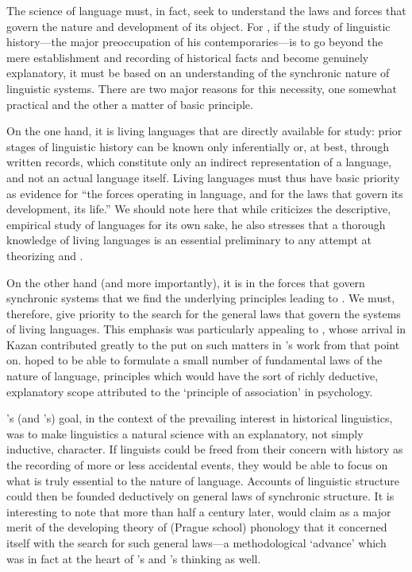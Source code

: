 The science of language must, in fact, seek to understand the laws and
forces that govern the nature and development of its object. For
{\Baudouin}, if the study of linguistic history—the major preoccupation
of his contemporaries—is to go beyond the mere establishment and
recording of historical facts and become genuinely explanatory, it
must be based on an understanding of the synchronic nature of
linguistic systems. There are two major reasons for this necessity,
one somewhat practical and the other a matter of basic principle.

On the one hand, it is living languages that are directly available
for study: prior stages of linguistic history can be known only
inferentially or, at best, through written records, which constitute
only an indirect representation of a language, and not an actual
language itself. Living languages must thus have basic priority as
evidence for ``the forces operating in language, and for the laws that
govern its development, its life.'' We should note here that while
{\Baudouin} criticizes the descriptive, empirical study of languages for
its own sake, he also stresses that a thorough knowledge of living
languages is an essential preliminary to any attempt at theorizing and
.

On the other hand (and more importantly), it is in the forces that
govern synchronic systems that we find the underlying principles
leading to . We must, therefore, give priority to the
search for the general laws that govern the systems of living
languages. This emphasis was particularly appealing to {\Kruszewski},
whose arrival in Kazan contributed greatly to the  put on such
matters in {\Baudouin}'s work from that point on. {\Kruszewski} hoped to be
able to formulate a small number of fundamental laws of the nature of
language, principles which would have the sort of richly deductive,
explanatory scope attributed to the `principle of association' in
psychology.

{\Kruszewski}'s (and {\Baudouin}'s) goal, in the context of the prevailing
interest in historical linguistics, was to make linguistics a natural
science with an explanatory, not simply inductive, character. If
linguists could be freed from their concern with history as the
recording of more or less accidental events, they would be able to
focus on what is truly essential to the nature of language. Accounts
of linguistic structure could then be founded deductively on general
laws of synchronic structure. It is interesting to note that more than%
half a century later, \citet{trubetzkoy33:phonologie} would claim as a
major merit of the developing theory of (Prague school) phonology that
it concerned itself with the search for such general laws—a
methodological `advance' which was in fact at the heart of {\Baudouin}'s
and {\Kruszewski}'s thinking as well.

